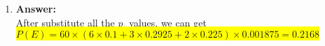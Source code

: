 \documentclass{article}
\newcommand{\myansw}{\textbf{Answer:}\\}
\begin{document}
\begin{enumerate}
\begin{enumerate}
		${P(I)=\frac{6!}{3!}(p_1^3 p_2 p_3 p_4 + p_1 p_2^3 p_3 p_4 + p_1 p_2 p_3^3 p_4+ p_1 p_2 p_3 p_4^3) = 120(p_1^2+p_2^2+p_3^2+p_4^2) p_1 p_2 p_3 p_4}$\\
		\myansw
		\colorbox{yellow}{
		${P(E)=60(6p_5 + 3(p_1 p_2 + p_1 p_3 + p_1 p_4 + p_2 p_3 + p_2 p_4 + p_3 p_4)+2(p_1^2+p_2^2+p_3^2+p_4^2))p_1p_2p_3p_4}$}\\
		\item
		\myansw
		After substitute all the ${p_i}$ values, we can get\\
		\colorbox{yellow}{
			${P(E)=60\times(6\times 0.1 + 3\times 0.2925+2\times 0.225)\times 0.001875=0.2168}$
		}
		
	\end{enumerate}





\end{enumerate}

\newpage
\end{document}
